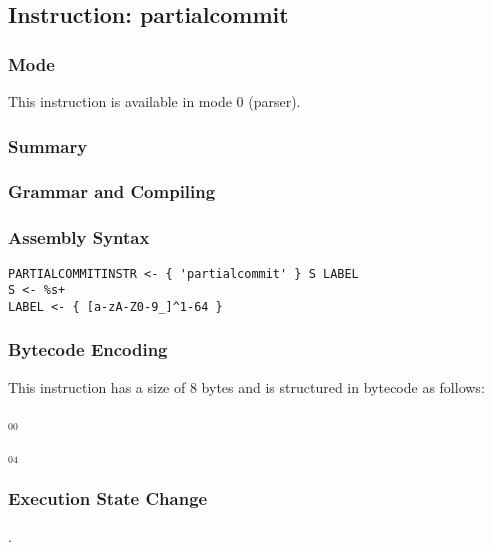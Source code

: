 \subsection{Instruction: partialcommit}

\subsubsection{Mode}
This instruction is available in mode 0 (parser).
\subsubsection{Summary}


\subsubsection{Grammar and Compiling}


\subsubsection{Assembly Syntax}

\begin{myquote}
\begin{verbatim}
PARTIALCOMMITINSTR <- { 'partialcommit' } S LABEL
S <- %s+
LABEL <- { [a-zA-Z0-9_]^1-64 }
\end{verbatim}
\end{myquote}

\subsubsection{Bytecode Encoding}

This instruction has a size of 8 bytes and is structured in bytecode as follows:

$_{00}$\ 



$_{04}$\ 


\subsubsection{Execution State Change}

.


